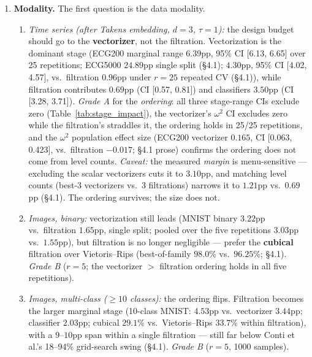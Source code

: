\documentclass[12pt, a4paper]{report}
\theoremstyle{definition}
\theoremstyle{plain}
\theoremstyle{remark}
\begin{document}
\begin{enumerate}
  \item \textbf{Modality.} The first question is the data modality.
    \begin{enumerate}
      \item \emph{Time series (after Takens embedding, $d{=}3$, $\tau{=}1$):}
        the design budget should go to the \textbf{vectorizer}, not the
        filtration. Vectorization is the dominant stage (ECG200 marginal
        range $6.39$pp, 95\% CI [6.13, 6.65] over 25 repetitions; ECG5000
        $24.89$pp single split (\S4.1);
        $4.30$pp, 95\% CI [4.02, 4.57], vs.\ filtration $0.96$pp under
        $r{=}25$ repeated CV (\S4.1)), while filtration contributes $0.69$pp
        (CI [0.57, 0.81]) and classifiers $3.50$pp (CI [3.28, 3.71]).
        \emph{Grade A} for the \emph{ordering}: all three stage-range CIs
        exclude zero (Table~\ref{tab:stage_impact}), the vectorizer's
        $\omega^2$ CI excludes zero while the filtration's straddles it,
        the ordering holds in 25/25
        repetitions, and the $\omega^2$ population effect size (ECG200
        vectorizer $0.165$, CI [0.063, 0.423], vs.~filtration $-0.017$;
        \S4.1 prose) confirms the ordering does not come from level counts.
        \emph{Caveat:} the measured \emph{margin} is menu-sensitive ---
        excluding the scalar vectorizers cuts it to $3.10$pp, and matching
        level counts (best-3 vectorizers vs.\ 3 filtrations) narrows it to
        $1.21$pp vs.\ $0.69$pp (\S4.1). The ordering survives; the size
        does not.
      \item \emph{Images, binary:} vectorization still leads (MNIST binary
        $3.22$pp vs.\ filtration $1.65$pp, single split; pooled over the
        five repetitions $3.03$pp vs.\ $1.55$pp), but filtration is no
        longer negligible --- prefer the \textbf{cubical} filtration over
        Vietoris--Rips (best-of-family $98.0$\% vs.\ $96.25$\%; \S4.1).
        \emph{Grade B} ($r{=}5$; the vectorizer $>$ filtration ordering
        holds in all five repetitions).
      \item \emph{Images, multi-class ($\ge 10$ classes):} the ordering
        flips. Filtration becomes the larger marginal stage (10-class
        MNIST: $4.53$pp vs.\ vectorizer $3.44$pp; classifier $2.03$pp;
        cubical $29.1$\% vs.\ Vietoris--Rips $33.7$\% within filtration),
        with a $9$--$10$pp span within a single filtration --- still far
        below Conti et al.'s 18--94\% grid-search swing (\S4.1).
        \emph{Grade B} ($r{=}5$, 1000 samples).

\end{enumerate}
\end{enumerate}
\end{document}
